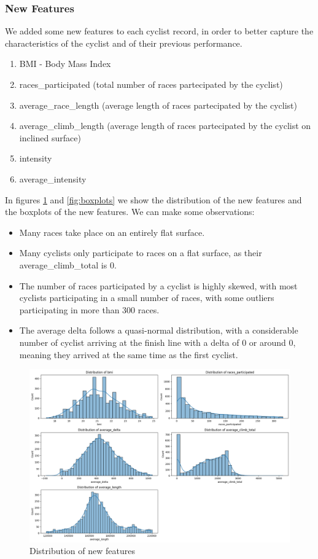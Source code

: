 \documentclass{article}
\begin{document}
\subsubsection{New Features}

We added some new features to each cyclist record, in order to better capture the characteristics of the cyclist and of their previous performance.

\begin{enumerate}
    \item BMI - Body Mass Index
    \item races\_participated (total number of races partecipated by the cyclist)
    \item average\_race\_length (average length of races partecipated by the cyclist)
    \item average\_climb\_length (average length of races partecipated by the cyclist on inclined surface)
    \item intensity 
    \item average\_intensity
\end{enumerate}

In figures \ref{fig:distributions} and \ref{fig:boxplots} we show the distribution of the new features and the boxplots of the new features.
We can make some observations:
\begin{itemize}
    \item Many races take place on an entirely flat surface.
    \item Many cyclists only participate to races on a flat surface, as their average\_climb\_total is 0.
    \item The number of races participated by a cyclist is highly skewed, with most cyclists participating in a small number of races, with some outliers participating in more than 300 races.
    \item The average delta follows a quasi-normal distribution, with a considerable number of cyclist arriving at the finish line with a delta of 0 or around 0, meaning they arrived at the same time as the first cyclist.
\end{itemize}

\begin{figure}[H]
\centering
\includegraphics[width=1\linewidth]{distributions.png}
\caption{\label{fig:distributions}Distribution of new features}
\end{figure}
\end{document}

